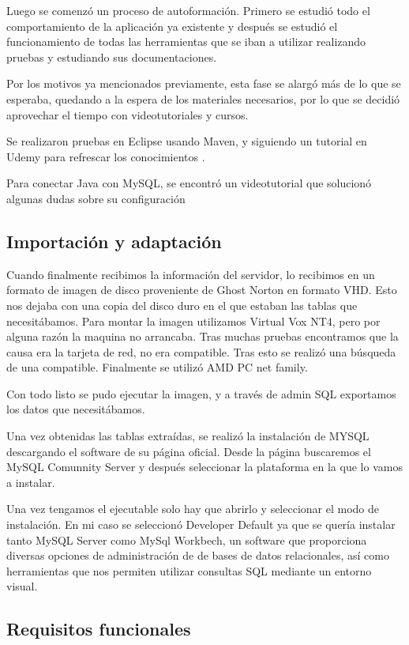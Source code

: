 Luego se comenzó un proceso de autoformación. Primero se estudió todo el comportamiento de la aplicación ya existente y después se estudió el funcionamiento de todas las herramientas que se iban a utilizar realizando pruebas y estudiando sus documentaciones.

Por los motivos ya mencionados previamente, esta fase se alargó más de lo que se esperaba, quedando a la espera de los materiales necesarios, por lo que se decidió aprovechar el tiempo con videotutoriales y cursos.

Se realizaron pruebas en Eclipse usando Maven, y siguiendo un tutorial en Udemy para refrescar los conocimientos \cite{curso:JSPin25Steps}.

Para conectar Java con MySQL, se encontró un videotutorial que solucionó algunas dudas sobre su configuración \cite{tutorial:javaMySQL}


\subsection{Importación y adaptación}

Cuando finalmente recibimos la información del servidor, lo recibimos en un formato de imagen de disco proveniente de Ghost Norton en formato VHD. Esto nos dejaba con una copia del disco duro en el que estaban las tablas que necesitábamos.
Para montar la imagen utilizamos Virtual Vox NT4, pero por alguna razón la maquina no arrancaba. Tras muchas pruebas encontramos que la causa era la tarjeta de red, no era compatible. Tras esto se realizó una búsqueda de una compatible. Finalmente se utilizó AMD PC net family. 

Con todo listo se pudo ejecutar la imagen, y a través de admin SQL exportamos los datos que necesitábamos.

Una vez obtenidas las tablas extraídas, se realizó la instalación de MYSQL descargando el software de su página oficial. Desde la página buscaremos el MySQL Comunnity Server y después seleccionar la plataforma en la que lo vamos a instalar.

Una vez tengamos el ejecutable solo hay que abrirlo y seleccionar el modo de instalación. En mi caso se seleccionó Developer Default ya que se quería instalar tanto MySQL Server como MySql Workbech, un software que proporciona diversas opciones de administración de de bases de datos relacionales, así como herramientas que nos permiten utilizar consultas SQL mediante un entorno visual.

\subsection{Requisitos funcionales}

